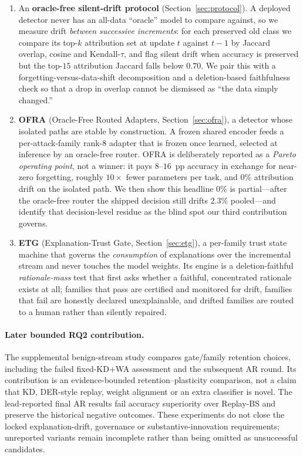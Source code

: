 \documentclass[conference]{IEEEtran}
\begin{document}
\begin{enumerate}
\item An \textbf{oracle-free silent-drift protocol} (Section~\ref{sec:protocol}).
A deployed detector never has an all-data ``oracle'' model to compare against, so
we measure drift \emph{between successive increments}: for each preserved old
class we compare its top-$k$ attribution set at update $t$ against $t{-}1$ by
Jaccard overlap, cosine and Kendall-$\tau$, and flag silent drift when accuracy
is preserved but the top-$15$ attribution Jaccard falls below $0.70$. We pair
this with a forgetting-versus-data-shift decomposition and a deletion-based
faithfulness check so that a drop in overlap cannot be dismissed as ``the data
simply changed.''

\item \textbf{OFRA} (Oracle-Free Routed Adapters, Section~\ref{sec:ofra}), a
detector whose isolated paths are stable by construction. A frozen shared
encoder feeds a per-attack-family rank-$8$ adapter that is frozen once learned,
selected at inference by an oracle-free router. OFRA is deliberately reported as
a \emph{Pareto operating point}, not a winner: it pays $8$--$16$~pp accuracy in
exchange for near-zero forgetting, roughly $10\times$ fewer parameters per task,
and $0\%$ attribution drift on the isolated path. We then show this headline
$0\%$ is partial---after the oracle-free router the shipped decision still drifts
$2.3\%$ pooled---and identify that decision-level residue as the blind spot our
third contribution governs.

\item \textbf{ETG} (Explanation-Trust Gate, Section~\ref{sec:etg}), a per-family
trust state machine that governs the \emph{consumption} of explanations over the
incremental stream and never touches the model weights. Its engine is a
deletion-faithful \emph{rationale-mass} test that first asks whether a faithful,
concentrated rationale exists at all; families that pass are certified and
monitored for drift, families that fail are honestly declared unexplainable, and
drifted families are routed to a human rather than silently repaired.
\end{enumerate}

\paragraph{Later bounded RQ2 contribution.}
The supplemental benign-stream study compares gate/family retention choices,
including the failed fixed-KD+WA assessment and the subsequent AR round. Its
contribution is an evidence-bounded retention--plasticity comparison, not a
claim that KD, DER-style replay, weight alignment or an extra classifier is
novel. The lead-reported final AR results fail accuracy superiority over
Replay-BS and preserve the historical negative outcomes. These experiments
do not close the locked explanation-drift, governance or substantive-innovation
requirements; unreported variants remain incomplete rather than being omitted
as unsuccessful candidates.
\end{document}
